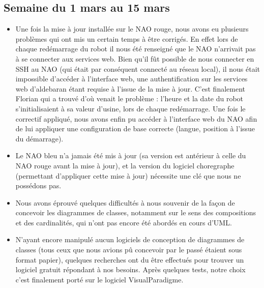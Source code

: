   \subsection{Semaine du 1 mars au 15 mars}
  \label{sub:Semaine du 1 mars au 15 mars}
    \begin{itemize}
      \item Une fois la mise à jour installée sur le NAO rouge, nous avons eu plusieurs problèmes qui ont mis un certain temps à être corrigés.
      En effet lors de chaque redémarrage du robot il nous été renseigné que le NAO n’arrivait pas à se connecter aux services web.
      Bien qu’il fût possible de nous connecter en SSH au NAO (qui était par conséquent connecté au réseau local),
      il nous était impossible d’accéder à l’interface web, une authentification sur les services web d’aldebaran étant requise à l’issue de la mise à jour.
      C’est finalement Florian qui a trouvé d’où venait le problème : l’heure et la date du robot s’initialisaient à sa valeur d’usine, lors de chaque redémarrage.
      Une fois le correctif appliqué, nous avons enfin pu accéder à l’interface web du NAO afin de lui appliquer une configuration de base correcte (langue, position à l'issue du démarrage).
      \item Le NAO bleu n’a jamais été mis à jour (sa version est antérieur à celle du NAO rouge avant la mise à jour),
      et la version du logiciel choregraphe (permettant d’appliquer cette mise à jour) nécessite une clé que nous ne possédons pas.
      \item Nous avons éprouvé quelques difficultés à nous souvenir de la façon de concevoir les diagrammes de classes,
      notamment sur le sens des compositions et des cardinalités, qui n'ont pas encore été abordés en cours d'UML.
      \item N'ayant encore manipulé aucun logiciels de conception de diagrammes de classes (tous ceux que nous avions pû concevoir par le passé étaient sous format papier),
      quelques recherches ont du être effectués pour trouver un logiciel gratuit répondant à nos besoins.
      Après quelques tests, notre choix c'est finalement porté sur le logiciel VisualParadigme.
    \end{itemize}
  \pagebreak



